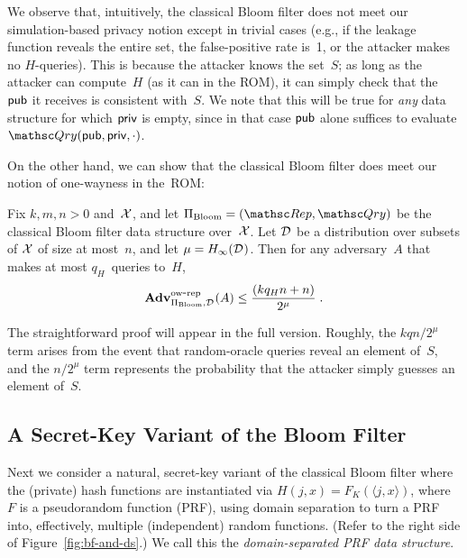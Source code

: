  We observe that, intuitively, the classical
Bloom filter does not meet our simulation-based privacy notion
except in trivial cases (e.g., if the leakage function reveals the
entire set, the false-positive rate is~1, or the attacker makes no
$H$-queries). This is because the attacker knows the set~$S$; as
long as the attacker can compute~$H$ (as it can in the ROM), it can
simply check that the ${\sf pub}$ it receives is consistent with~$S$.
We note that this will be true for \emph{any} data structure for
which ${\sf priv}$ is empty, since in that case ${\sf pub}$ alone
suffices to evaluate $\Qry(\pubaux,\privaux,\cdot)$. 

On the other hand, we can show that the classical Bloom filter does
meet our notion of one-wayness in the~ROM:

\begin{theorem}%
\label{thm:bf-ow} Fix $k,m,n>0$ and~${\cal X}$, and let
$\setprim_{\mathrm{Bloom}}= (\Rep, \Qry)$ be the classical Bloom
filter data structure over~${\cal X}$. Let $\mathcal{D}_{}^{}$ be a
distribution over subsets of ${\cal X}$ of size at most~$n$, and let
$\mu = H_\infty(\mathcal{D}_{}^{})$. Then for any adversary~$A$ that makes
at most $q_H$~queries to~$H$,
\[
\mathrm{\mathbf{Adv}}^{\mathrm{ow\mbox{-}rep}}_{\Pi_{\mathrm{Bloom}},\mathcal{D}_{}^{}}(A) \leq  \frac{(kq_H n+n)}{2^{\mu}}\;.
\]
\end{theorem}
 The
straightforward proof will appear in the full version. Roughly, the
$kqn/2^{\mu}$ term  arises from the event that
random-oracle queries reveal an element of~$S$, and the $n/2^\mu$
term represents the probability that the attacker simply guesses an
element of~$S$.


\subsection{A Secret-Key Variant of the Bloom Filter}
Next we consider a natural, secret-key variant of the classical
Bloom filter where the (private) hash functions are instantiated via
$H(j,x)=F_K(\langle j,x\rangle)$, where $F$ is a pseudorandom
function (PRF), using domain separation to turn a PRF into,
effectively, multiple (independent) random functions. (Refer to the
right side of Figure~\ref{fig:bf-and-ds}.) We call this the
\emph{domain-separated PRF data structure}.

